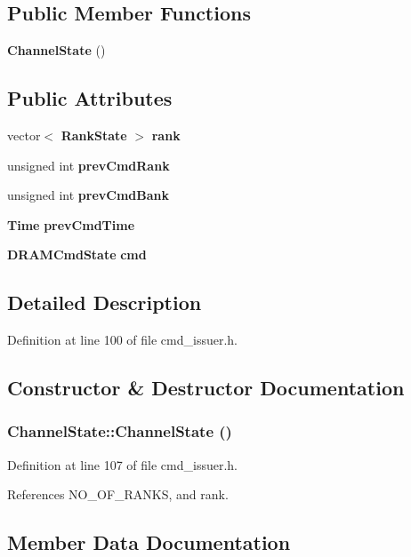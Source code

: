 \subsection*{Public Member Functions}
\begin{CompactItemize}
\item 
{\bf ChannelState} ()
\end{CompactItemize}
\subsection*{Public Attributes}
\begin{CompactItemize}
\item 
vector$<$ {\bf RankState} $>$ {\bf rank}
\item 
unsigned int {\bf prevCmdRank}
\item 
unsigned int {\bf prevCmdBank}
\item 
{\bf Time} {\bf prevCmdTime}
\item 
{\bf DRAMCmdState} {\bf cmd}
\end{CompactItemize}


\subsection{Detailed Description}


Definition at line 100 of file cmd\_\-issuer.h.

\subsection{Constructor \& Destructor Documentation}
\subsubsection[{ChannelState}]{\setlength{\rightskip}{0pt plus 5cm}ChannelState::ChannelState ()\hspace{0.3cm}{\tt  [inline]}}\label{structChannelState_8f3f06dcef9109fc69d2f62bdc347057}




Definition at line 107 of file cmd\_\-issuer.h.

References NO\_\-OF\_\-RANKS, and rank.

\subsection{Member Data Documentation}
